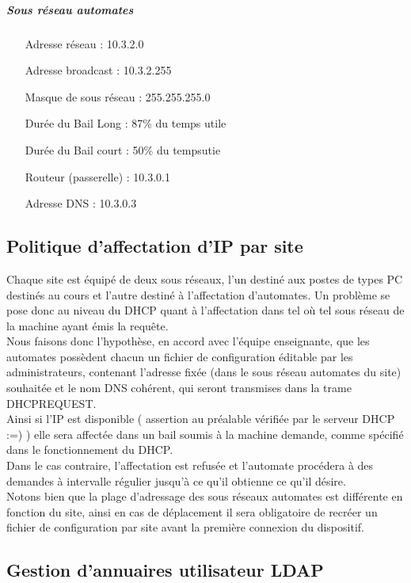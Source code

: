 \documentclass[a4paper]{article}
\begin{document}
\subparagraph{Sous réseau automates}
\begin{itemize}
\item[Adresse réseau]: 10.3.2.0
\item[Adresse broadcast]: 10.3.2.255
\item[Masque de sous réseau]: 255.255.255.0
\item[Durée du Bail Long]: 87\% du temps utile
\item[Durée du Bail court]: 50\% du tempsutie
\item[Routeur (passerelle)]: 10.3.0.1
\item[Adresse DNS]: 10.3.0.3
\end{itemize}

\subsection{Politique d'affectation d'IP par site}

Chaque site est équipé de deux sous réseaux, l'un destiné aux postes de types PC destinés au cours et l'autre destiné à l'affectation d'automates. Un problème se pose donc au niveau du DHCP quant à l'affectation dans tel où tel sous réseau de la machine ayant émis la requête.\\
Nous faisons donc l'hypothèse, en accord avec l'équipe enseignante, que les automates possèdent chacun un fichier de configuration éditable par les administrateurs, contenant l'adresse fixée (dans le sous réseau automates du site) souhaitée et le nom DNS cohérent, qui seront transmises dans la trame DHCPREQUEST.\\
Ainsi si l'IP est disponible ( assertion au préalable vérifiée par le serveur DHCP :=) ) elle sera affectée dans un bail soumis à la machine demande, comme spécifié dans le fonctionnement du DHCP.\\
Dans le cas contraire, l'affectation est refusée et l'automate procédera à des demandes à intervalle régulier jusqu'à ce qu'il obtienne ce qu'il désire.\\
Notons bien que la plage d'adressage des sous réseaux automates est différente en fonction du site, ainsi en cas de déplacement il sera obligatoire de recréer un fichier de configuration par site avant la première connexion du dispositif. 

\subsection{Gestion d'annuaires utilisateur LDAP}
\end{document}
